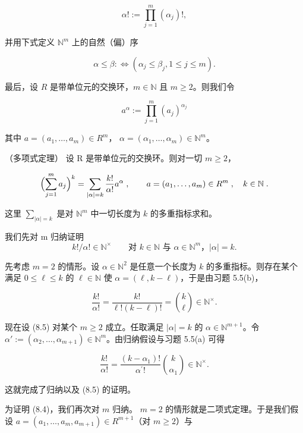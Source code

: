 \[
\alpha!:=\prod_{j=1}^{m}(\alpha_{j})!,
\]

并用下式定义  $ \mathbb{N}^{m} $ 上的自然（偏）序

\[
\alpha\leq\beta:\Leftrightarrow(\alpha_{j}\leq\beta_{j},1\leq j\leq m).
\]

最后，设 $R$ 是带单位元的交换环，$m \in \mathbb{N}$ 且 $m \geq 2$。则我们令

\[
a^{\alpha}:=\prod_{j=1}^{m}(a_{j})^{\alpha_{j}}
\]

其中  $ a = (a_1, \ldots, a_m) \in R^m $， $ \alpha = (\alpha_1, \ldots, \alpha_m) \in \mathbb{N}^m $。

\begin{theorem}

（多项式定理） 设 R 是带单位元的交换环。则对一切  $ m \geq 2 $，

\begin{equation}
\Bigl(\sum_{j=1}^{m}a_{j}\Bigr)^{k}=\sum_{|\alpha|=k}\frac{k!}{\alpha!}a^{\alpha}\;,\qquad a=(a_{1},\ldots,a_{m})\in R^{m}\;,\quad k\in\mathbb{N}\;.
\end{equation}

这里  $ \sum_{|\alpha|=k} $ 是对  $ \mathbb{N}^m $ 中一切长度为  $ k $ 的多重指标求和。

\proofhead
我们先对 m 归纳证明
\begin{equation}
k!/\alpha!\in\mathbb{N}^{\times}\qquad\text{对 }k\in\mathbb{N}\text{ 与 }\alpha\in\mathbb{N}^{m}\text{，}|\alpha|=k.
\end{equation}

先考虑  $ m = 2 $ 的情形。设  $ \alpha \in \mathbb{N}^2 $ 是任意一个长度为  $ k $ 的多重指标。则存在某个满足  $ 0 \leq \ell \leq k $ 的  $ \ell \in \mathbb{N} $ 使  $ \alpha = (\ell, k - \ell) $，于是由习题 5.5(b)，

\[
\frac{k!}{\alpha!}=\frac{k!}{\ell!(k-\ell)!}=\binom{k}{\ell}\in\mathbb{N}^{\times}.
\]

现在设 (8.5) 对某个  $ m \geq 2 $ 成立。任取满足  $ |\alpha| = k $ 的  $ \alpha \in \mathbb{N}^{m+1} $。令  $ \alpha' := (\alpha_2, \ldots, \alpha_{m+1}) \in \mathbb{N}^m $。由归纳假设与习题 5.5(a) 可得

\begin{equation}
\frac{k!}{\alpha!}=\frac{(k-\alpha_{1})!}{\alpha^{\prime}!}\binom{k}{\alpha_{1}}\in\mathbb{N}^{\times}.
\end{equation}

这就完成了归纳以及 (8.5) 的证明。

为证明 (8.4)，我们再次对  $ m $ 归纳。 $ m = 2 $ 的情形就是二项式定理。于是我们假设  $ a = (a_1, \ldots, a_m, a_{m+1}) \in R^{m+1} $（对  $ m \geq 2 $）与


\end{theorem}
